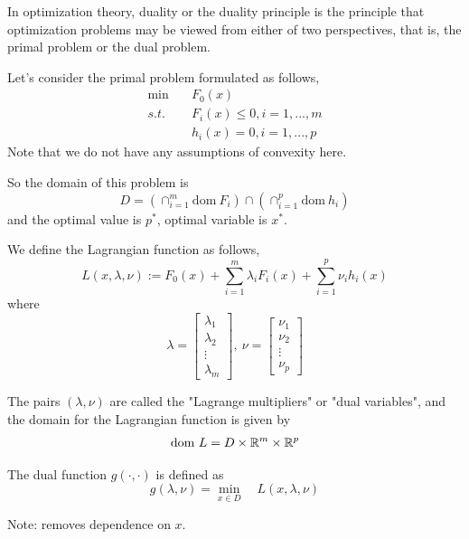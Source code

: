 
In optimization theory, duality or the duality principle is the principle that optimization problems may be viewed from either of two perspectives, that is, the primal problem or the dual problem.

Let's consider the primal problem formulated as follows,
\begin{align*}
	\min \quad&F_0(x) \\
	s.t. \quad&F_i(x)\leq 0, i = 1,...,m\\
	&h_i(x)= 0, i = 1,...,p
\end{align*}
Note that we do not have any assumptions of convexity here.

So the domain of this problem is
$$D = (\cap^m_{i=1}\text{dom}\ F_i)\cap(\cap^p_{i=1}\text{dom}\ h_i)$$ 
and the optimal value is $p^*$, optimal variable is $x^*$.

\begin{definition}
	We define the Lagrangian function as follows,
	$$L(x,\lambda,\nu) := F_0(x) + \sum^m_{i=1}\lambda_i F_i(x) + \sum^p_{i=1}\nu_i h_i(x)$$
	where
	$$\lambda =
	\begin{bmatrix}
	\lambda_1\\
	\lambda_2\\
	\vdots\\
	\lambda_m
	\end{bmatrix},\
	\nu = 
	\begin{bmatrix}
	\nu_1\\
	\nu_2\\
	\vdots\\
	\nu_p
	\end{bmatrix}$$
	
	The pairs $(\lambda, \nu)$ are called the "Lagrange multipliers" or "dual variables", and the domain for the Lagrangian function is given by 
	$$\text{dom}\ L = D\times \mathbb{R}^m \times \mathbb{R}^p$$
\end{definition}

\begin{definition}
	The dual function $g(\cdot, \cdot)$ is defined as 
	\begin{equation*}
		g(\lambda, \nu) = \min_{x\in D}\quad L(x,\lambda,\nu)
	\end{equation*}
	
	Note: removes dependence on $x$.
\end{definition}


